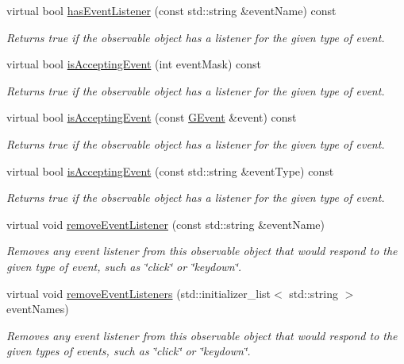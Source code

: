 \begin{DoxyCompactItemize}
virtual bool \mbox{\hyperlink{classGObservable_a9f6faaa25942923bafa1c44020c49fa9}{has\+Event\+Listener}} (const std\+::string \&event\+Name) const
\begin{DoxyCompactList}\small\item\em Returns true if the observable object has a listener for the given type of event. \end{DoxyCompactList}\item 
virtual bool \mbox{\hyperlink{classGObservable_aeec1adc19aa0f33de62390686ee1382c}{is\+Accepting\+Event}} (int event\+Mask) const
\begin{DoxyCompactList}\small\item\em Returns true if the observable object has a listener for the given type of event. \end{DoxyCompactList}\item 
virtual bool \mbox{\hyperlink{classGObservable_aa31c73145a29dcb92848a92e0cfaea41}{is\+Accepting\+Event}} (const \mbox{\hyperlink{classGEvent}{G\+Event}} \&event) const
\begin{DoxyCompactList}\small\item\em Returns true if the observable object has a listener for the given type of event. \end{DoxyCompactList}\item 
virtual bool \mbox{\hyperlink{classGObservable_a3b1c689267eda44e65a2213e7de38b23}{is\+Accepting\+Event}} (const std\+::string \&event\+Type) const
\begin{DoxyCompactList}\small\item\em Returns true if the observable object has a listener for the given type of event. \end{DoxyCompactList}\item 
virtual void \mbox{\hyperlink{classGObservable_acbcf1ed3a851ad8a3c17ef38d86b481d}{remove\+Event\+Listener}} (const std\+::string \&event\+Name)
\begin{DoxyCompactList}\small\item\em Removes any event listener from this observable object that would respond to the given type of event, such as \char`\"{}click\char`\"{} or \char`\"{}keydown\char`\"{}. \end{DoxyCompactList}\item 
virtual void \mbox{\hyperlink{classGObservable_af51cc35c29a1bd1908609d432decdbb6}{remove\+Event\+Listeners}} (std\+::initializer\+\_\+list$<$ std\+::string $>$ event\+Names)
\begin{DoxyCompactList}\small\item\em Removes any event listener from this observable object that would respond to the given types of events, such as \char`\"{}click\char`\"{} or \char`\"{}keydown\char`\"{}. \end{DoxyCompactList}\item 

\end{DoxyCompactItemize}
